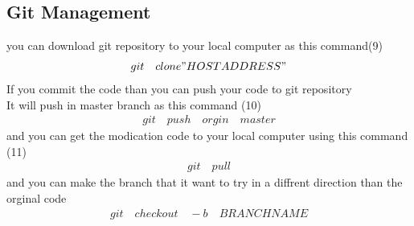 \documentclass[12pt]{article}
\begin{document}
\subsection{Git Management}
	you can download git repository to your local computer as this command(9)
\begin{align}
git \quad clone "HOSTADDRESS"
\end{align}
		If you commit the code than you can push your code to git repository
		\\ It will push in master branch		
		as this command (10)
\begin{align}
git \quad push \quad orgin \quad master
\end{align}
		and you can get the modication code to your local computer using this command (11)
\begin{align}
git \quad pull 
\end{align} 
and you can make the branch that it want to try in a diffrent direction than the orginal code
\begin{align}
git \quad checkout \quad -b \quad BRANCHNAME
\end{align}
		

\begin{figure}[!h]
\end{figure}
                       
  
  
  
\end{document}
